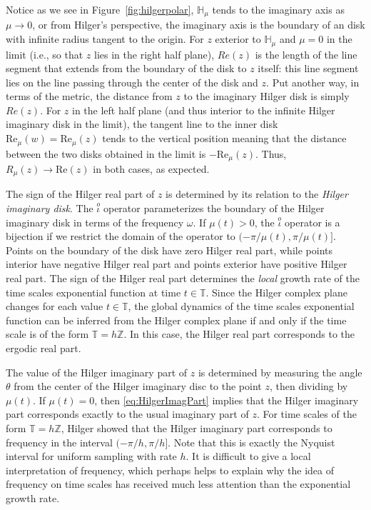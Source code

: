 \documentclass[reqno]{amsart}
\theoremstyle{plain}
\theoremstyle{definition}
\numberwithin{theorem}{section}
\numberwithin{definition}{section}
\numberwithin{prop}{section}
\numberwithin{example}{section}
\newcommand{\G}{\ensuremath{\mathbb{H}}}
\begin{document}
Notice as we see in Figure~\ref{fig:hilgerpolar}, $\G_\mu$ tends to the imaginary axis as $\mu \to 0$, or from Hilger's perspective, the imaginary axis is the boundary of an disk with infinite radius tangent to the origin.  For $z$ exterior to $\G_\mu$ and $\mu=0$ in the limit (i.e., so that $z$ lies in the right half plane), $Re(z)$ is the length of the line segment that extends from the boundary of the disk to $z$ itself: this line segment lies on the line passing through the center of the disk and $z$. Put another way, in terms of the metric, the distance from $z$ to the imaginary Hilger disk is simply $Re(z)$.  For $z$ in the left half plane (and thus interior to the infinite Hilger imaginary disk in the limit), the tangent line to the inner disk $\text{Re}_\mu(w)=\text{Re}_\mu(z)$ tends to the vertical position meaning that the distance between the two disks obtained in the limit is $-\text{Re}_\mu(z)$.  Thus, $R_{\mu}(z) \to \text{Re}(z)$ in both cases, as expected.

The sign of the Hilger real part of $z$ is determined by its relation to the {\em Hilger imaginary disk}. The $\stackrel{o}{\iota}$ operator parameterizes the boundary of the Hilger imaginary disk in terms of the frequency $\omega$. If $\mu(t)>0$, the $\stackrel{o}{\iota}$ operator is a bijection if we restrict the domain of the operator to $(-\pi/\mu(t),\pi/\mu(t)]$. Points on the boundary of the disk have zero Hilger real part, while points interior have negative Hilger real part and points exterior have positive Hilger real part. The sign of the Hilger real part determines the {\em local} growth rate of the time scales exponential function at time $t \in \mathbb{T}$. Since the Hilger complex plane changes for each value $t \in \mathbb{T}$, the global dynamics of the time scales exponential function can be inferred from the Hilger complex plane if and only if the time scale is of the form $\mathbb{T}=h \mathbb{Z}$. In this case, the Hilger real part corresponds to the ergodic real part.

The value of the Hilger imaginary part of $z$ is determined by measuring the angle $\theta$ from the center of the Hilger imaginary disc to the point $z$, then dividing by $\mu(t)$. If $\mu(t)=0$, then \eqref{eq:HilgerImagPart} implies that the Hilger imaginary part corresponds exactly to the usual imaginary part of $z$. For time scales of the form $\mathbb{T}=h \mathbb{Z}$, Hilger showed that the Hilger imaginary part corresponds to frequency in the interval $(-\pi/h,\pi/h]$. Note that this is exactly the Nyquist interval for uniform sampling with rate $h$. It is difficult to give a local interpretation of frequency, which perhaps helps to explain why the idea of frequency on time scales has received much less attention than the exponential growth rate.
\end{document}
